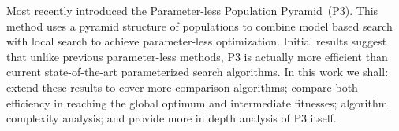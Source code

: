 Most recently \cite{goldman:2014:p3} introduced the Parameter-less Population Pyramid~(P3).
This method uses a pyramid structure of populations to combine model based search with local search
to achieve parameter-less optimization. Initial results suggest that unlike
previous parameter-less methods, P3 is actually more efficient than current state-of-the-art
parameterized search algorithms. In this work we shall: extend these results to cover more
comparison algorithms; compare both efficiency in reaching the global optimum and intermediate
fitnesses; algorithm complexity analysis; and provide more in depth analysis of P3 itself.

